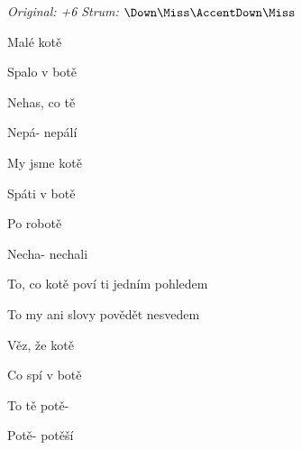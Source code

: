 \begin{song}


\begin{headerbox}
\RaiseBoxWithAccents
{} \quad
\textit{Original: +6} \quad
\textit{Strum:} $\Down\Miss\AccentDown\Miss$
\end{headerbox}

\begin{hchordbox}
\end{hchordbox}

\Large

\bigskip

\bigskip

Malé kotě   \par
{}Spalo v botě   \par
{}Nehas, co tě   \par
{}Nepá- nepálí \par

\bigskip

My jsme kotě   \par
{}Spáti v botě   \par
{}Po robotě   \par
{}Necha- nechali \par

\bigskip

To, co kotě poví ti jedním pohledem \par
{}To my ani slovy povědět nesvedem \par

\bigskip

Věz, že kotě   \par
{}Co spí v botě   \par
{}To tě potě-   \par
{}Potě- potěší \par


\end{song}
